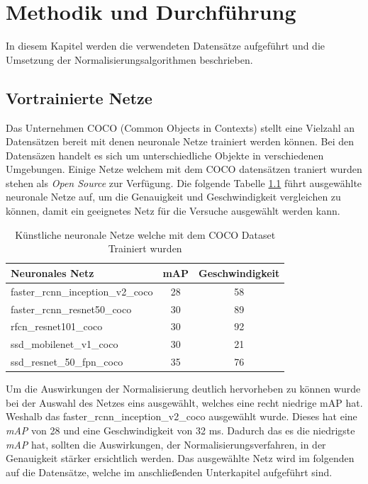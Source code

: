 \chapter{Methodik und Durchführung}\label{s.methudurchf}
In diesem Kapitel werden die verwendeten Datensätze aufgeführt und die Umsetzung der Normalisierungsalgorithmen beschrieben.  
 \section{Vortrainierte Netze}\label{s.modell}
Das Unternehmen COCO \cite{common2018data} (Common Objects in Contexts) stellt eine Vielzahl an Datensätzen bereit mit denen neuronale Netze trainiert werden können. Bei den Datensäzen handelt es sich um unterschiedliche Objekte in verschiedenen Umgebungen.  
Einige Netze welchem mit dem COCO datensätzen traniert wurden stehen als \textit{Open Source} zur Verfügung. Die folgende Tabelle \ref{tab:cocomodels} führt ausgewählte neuronale Netze auf, um die Genauigkeit und Geschwindigkeit vergleichen zu können, damit ein geeignetes Netz für die Versuche ausgewählt werden kann.
\begin{table}
[h]
\caption{Künstliche neuronale Netze \cite{google2018tens} welche mit dem COCO Dataset Trainiert wurden \cite{common2018data}} 
\label{tab:cocomodels}
\centering
\begin{tabular}{|l|c|c|}
\hline
Neuronales Netz & mAP & Geschwindigkeit\\
\hline
faster\_rcnn\_inception\_v2\_coco & 28 & 58\\
faster\_rcnn\_resnet50\_coco & 30 & 89\\
rfcn\_resnet101\_coco & 30 & 92\\
ssd\_mobilenet\_v1\_coco & 30 & 21\\
ssd\_resnet\_50\_fpn\_coco & 35 & 76\\
\hline
\end{tabular}
\end{table}
Um die Auswirkungen der Normalisierung deutlich hervorheben zu können wurde bei der Auswahl des Netzes eins ausgewählt, welches eine recht niedrige mAP hat. Weshalb das faster\_rcnn\_inception\_v2\_coco ausgewählt wurde. Dieses hat eine \textit{mAP} von 28 und eine Geschwindigkeit von 32 ms. Dadurch das es die niedrigste \textit{mAP} hat, sollten die Auswirkungen, der Normalisierungsverfahren, in der Genauigkeit stärker ersichtlich werden. Das ausgewählte Netz wird im folgenden auf die Datensätze, welche im anschließenden Unterkapitel aufgeführt sind.

